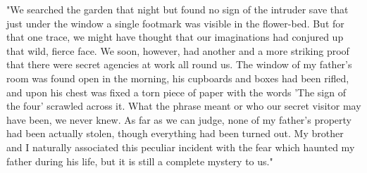 \documentclass[a4paper,oneside,12pt]{amsart}
\begin{document}
{ 
"We searched the garden that night but found no sign of the intruder save that just under the window a single footmark was visible in the flower-bed. But for that one trace, we might have thought that our imaginations had conjured up that wild, fierce face. We soon, however, had another and a more striking proof that there were secret agencies at work all round us. The window of my father's room was found open in the morning, his cupboards and boxes had been rifled, and upon his chest was fixed a torn piece of paper with the words 'The sign of the four' scrawled across it. What the phrase meant or who our secret visitor may have been, we never knew. As far as we can judge, none of my father's property had been actually stolen, though everything had been turned out. My brother and I naturally associated this peculiar incident with the fear which haunted my father during his life, but it is still a complete mystery to us."
\\ } 
\end{document}
